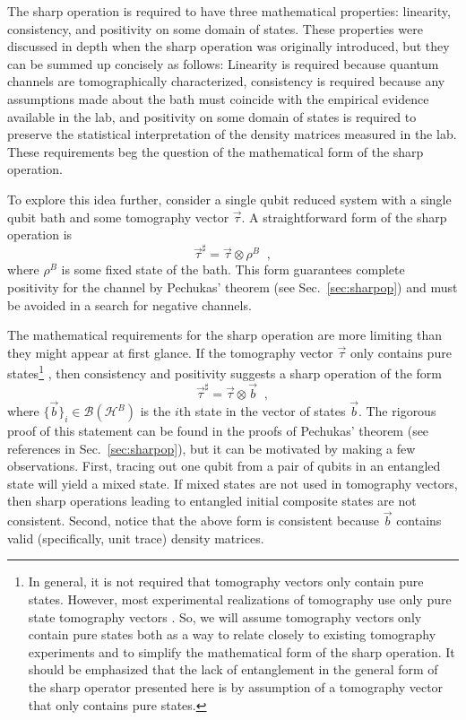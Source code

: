 The sharp operation is required to have three mathematical properties: linearity, consistency, and positivity on some domain of states.  These properties were discussed in depth when the sharp operation was originally introduced, but they can be summed up concisely as follows:  Linearity is required because quantum channels are tomographically characterized, consistency is required because any assumptions made about the bath must coincide with the empirical evidence available in the lab, and positivity on some domain of states is required to preserve the statistical interpretation of the density matrices measured in the lab.  These requirements beg the question of the mathematical form of the sharp operation.

To explore this idea further, consider a single qubit reduced system with a single qubit bath and some tomography vector $\vec{\tau}$.  A straightforward form of the sharp operation is
\begin{equation}
\vec{\tau}^\sharp = \vec{\tau}\otimes \rho^B\;\;,
\end{equation}
where $\rho^B$ is some fixed state of the bath.  This form guarantees complete positivity for the channel by Pechukas' theorem (see Sec.\ \ref{sec:sharpop}) and must be avoided in a search for negative channels.  

The mathematical requirements for the sharp operation are more limiting than they might appear at first glance.  If the tomography vector $\vec{\tau}$ only contains pure states\footnote{In general, it is not required that tomography vectors only contain pure states.  However, most experimental realizations of tomography use only pure state tomography vectors \cite{Paris2004, Nielsen2010}.  So, we will assume tomography vectors only contain pure states both as a way to relate closely to existing tomography experiments and to simplify the mathematical form of the sharp operation.  It should be emphasized that the lack of entanglement in the general form of the sharp operator presented here is by assumption of a tomography vector that only contains pure states.} , then consistency and positivity suggests a sharp operation of the form
\begin{equation}
\label{eqn:sharp1}
\vec{\tau}^\sharp = \vec{\tau}\otimes \vec{b}\;\;,
\end{equation}
where $\{\vec{b}\}_i\in\mathcal{B}(\mathcal{H}^B)$ is the $i$th state in the vector of states $\vec{b}$.  The rigorous proof of this statement can be found in the proofs of Pechukas' theorem (see references in Sec.\ \ref{sec:sharpop}), but it can be motivated by making a few observations.  First, tracing out one qubit from a pair of qubits in an entangled state will yield a mixed state.  If mixed states are not used in tomography vectors, then sharp operations leading to entangled initial composite states are not consistent.  Second, notice that the above form is consistent because $\vec{b}$ contains valid (specifically, unit trace) density matrices. 


